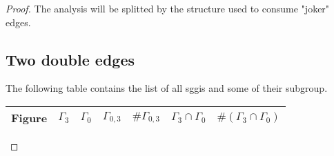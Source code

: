 \begin{proof}
  The analysis will be splitted by the structure used to consume "joker" edges.

  \subsection{Two double edges}

  The following table contains the list of all sggis and some of their subgroup.


\begin{table}[H]
  \centering
  \begin{tabular}{|c|c|c|c|c|c|c|}
    \hline
    Figure & $\Gamma_3$ & $\Gamma_0$ & $\Gamma_{0,3}$ & $\#\Gamma_{0,3}$ & $\Gamma_3 \cap \Gamma_0$ & $\#(\Gamma_3 \cap \Gamma_0)$ \\ \hline


\end{tabular}
\end{table}
\end{proof}
